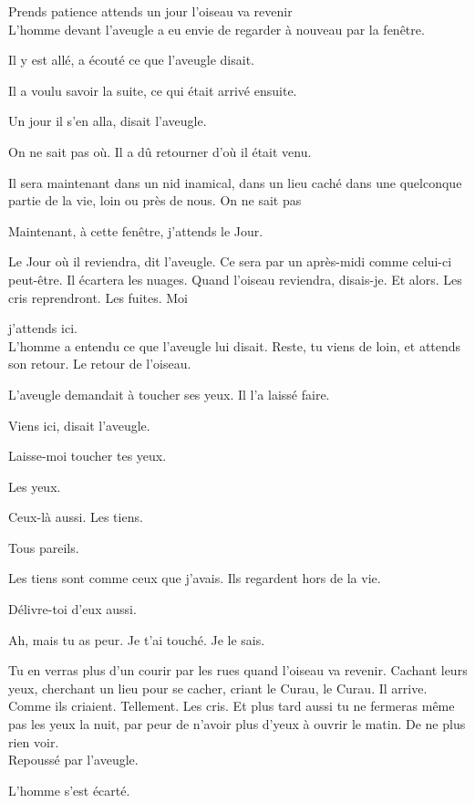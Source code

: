 Prends patience attends un jour l'oiseau va revenir\\

L'homme devant l'aveugle a eu envie de regarder à nouveau par la
fenêtre.

Il y est allé, a écouté ce que l'aveugle disait.

Il a voulu savoir la suite, ce qui était arrivé ensuite.

Un jour il s'en alla, disait l'aveugle.

On ne sait pas où. Il a dû retourner d'où il était venu.

Il sera maintenant dans un nid inamical, dans un lieu caché dans une
quelconque partie de la vie, loin ou près de nous. On ne sait pas

Maintenant, à cette fenêtre, j'attends le Jour.

Le Jour où il reviendra, dit l'aveugle. Ce sera par un après-midi comme
celui-ci peut-être. Il écartera les nuages. Quand l'oiseau reviendra,
disais-je. Et alors. Les cris reprendront. Les fuites. Moi

j'attends ici.\\

L'homme a entendu ce que l'aveugle lui disait. Reste, tu viens de loin,
et attends son retour. Le retour de l'oiseau.

L'aveugle demandait à toucher ses yeux. Il l'a laissé faire.

Viens ici, disait l'aveugle.

Laisse-moi toucher tes yeux.

Les yeux.

Ceux-là aussi. Les tiens.

Tous pareils.

Les tiens sont comme ceux que j'avais. Ils regardent hors de la vie.

Délivre-toi d'eux aussi.

Ah, mais tu as peur. Je t'ai touché. Je le sais.

Tu en verras plus d'un courir par les rues quand l'oiseau va revenir.
Cachant leurs yeux, cherchant un lieu pour se cacher, criant le Curau,
le Curau. Il arrive. Comme ils criaient. Tellement. Les cris. Et plus
tard aussi tu ne fermeras même pas les yeux la nuit, par peur de n'avoir
plus d'yeux à ouvrir le matin. De ne plus rien voir.\\

Repoussé par l'aveugle.

L'homme s'est écarté.

